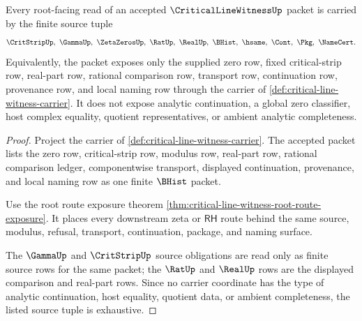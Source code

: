 \begin{theorem}
\label{thm:critical-line-witness-root-finite-source-carrier}
Every root-facing read of an accepted $\CriticalLineWitnessUp$ packet is carried by the finite source tuple
$$
\CritStripUp,\ \GammaUp,\ \ZetaZerosUp,\ \RatUp,\ \RealUp,\ \BHist,\ \hsame,\ \Cont,\ \Pkg,\ \NameCert.
$$
Equivalently, the packet exposes only the supplied zero row, fixed critical-strip row, real-part row, rational comparison row, transport row, continuation row, provenance row, and local naming row through the carrier of \autoref{def:critical-line-witness-carrier}. It does not expose analytic continuation, a global zero classifier, host complex equality, quotient representatives, or ambient analytic completeness.
\end{theorem}
\begin{proof}
Project the carrier of \autoref{def:critical-line-witness-carrier}. The accepted packet lists the zero row, critical-strip row, modulus row, real-part row, rational comparison ledger, componentwise transport, displayed continuation, provenance, and local naming row as one finite $\BHist$ packet.

Use the root route exposure theorem \autoref{thm:critical-line-witness-root-route-exposure}. It places every downstream zeta or $\mathsf{RH}$ route behind the same source, modulus, refusal, transport, continuation, package, and naming surface.

The $\GammaUp$ and $\CritStripUp$ source obligations are read only as finite source rows for the same packet; the $\RatUp$ and $\RealUp$ rows are the displayed comparison and real-part rows. Since no carrier coordinate has the type of analytic continuation, host equality, quotient data, or ambient completeness, the listed source tuple is exhaustive.
\end{proof}

